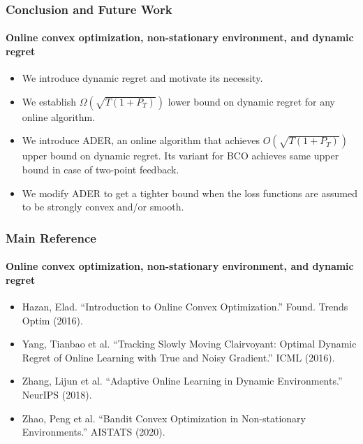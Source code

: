 \documentclass{beamer}
\begin{document}
    \begin{frame}
        \frametitle{Conclusion and Future Work}
        \framesubtitle{Online convex optimization, non-stationary environment, and dynamic regret}
        \begin{itemize}
            \item We introduce dynamic regret and motivate its necessity. 
            \item We establish $\Omega(\sqrt{T(1+P_T)})$ lower bound on dynamic regret for any online algorithm. 
            \item We introduce ADER, an online algorithm that achieves $O(\sqrt{T(1+P_T)})$ upper bound on dynamic regret. Its variant for BCO achieves same upper bound in case of two-point feedback. 
            \item We modify ADER to get a tighter bound when the loss functions are assumed to be strongly convex and/or smooth.
        \end{itemize}    
    \end{frame}
    \begin{frame}
        \frametitle{Main Reference}
        \framesubtitle{Online convex optimization, non-stationary environment, and dynamic regret}
        \begin{itemize}
            \item Hazan, Elad. “Introduction to Online Convex Optimization.” Found. Trends Optim (2016).
            \item Yang, Tianbao et al. “Tracking Slowly Moving Clairvoyant: Optimal Dynamic Regret of Online Learning with True and Noisy Gradient.” ICML (2016).
            \item Zhang, Lijun et al. “Adaptive Online Learning in Dynamic Environments.” NeurIPS (2018).
            \item Zhao, Peng et al. “Bandit Convex Optimization in Non-stationary Environments.” AISTATS (2020).
        \end{itemize}    
    \end{frame}
\end{document}
